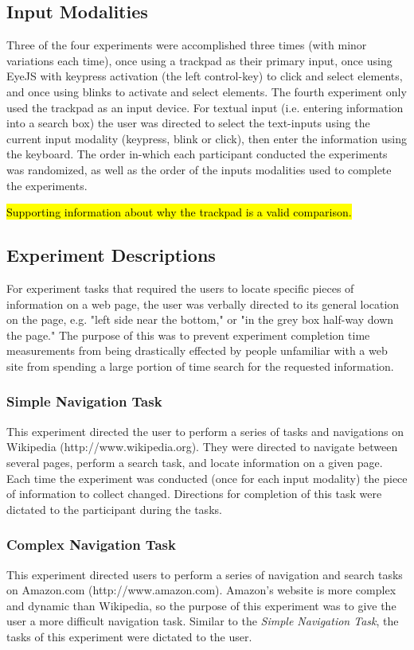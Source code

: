 \documentclass{sigchi}
\begin{document}
\subsection{Input Modalities}
Three of the four experiments were accomplished three times (with 
minor variations each time), once using a trackpad as their
primary input, once using EyeJS with keypress activation (the 
left control-key) to click and select elements, and once using 
blinks to activate and select elements. The fourth experiment 
only used the trackpad as an input device. For textual input (i.e. 
entering information into a search box) the user was directed to 
select the text-inputs using the current input modality (keypress, 
blink or click), then enter the information using the keyboard. 
The order in-which each participant conducted the experiments was 
randomized, as well as the order of the inputs modalities
used to complete the experiments. 

\hl{Supporting information about why the trackpad is a valid 
comparison.}


\subsection{Experiment Descriptions}
For experiment tasks that required the users to locate specific pieces
of information on a web page, the user was verbally directed to its
general location on the page, e.g. "left side near the bottom," or
"in the grey box half-way down the page." The purpose of this was to
prevent experiment completion time measurements from being drastically
effected by people unfamiliar with a web site from spending a large 
portion of time search for the requested information.

\subsubsection{Simple Navigation Task}
This experiment directed the user to perform a series of tasks and 
navigations on Wikipedia (http://www.wikipedia.org). They were directed
to navigate between several pages, perform a search task, and locate
information on a given page. Each time the experiment was conducted (once
for each input modality) the piece of information to collect changed.
Directions for completion of this task were dictated to the participant
during the tasks.

\subsubsection{Complex Navigation Task}
This experiment directed users to perform a series of navigation and
search tasks on Amazon.com (http://www.amazon.com). Amazon's website
is more complex and dynamic than Wikipedia, so the purpose of this 
experiment was to give the user a more difficult navigation task.
Similar to the \textit{Simple Navigation Task}, the tasks of this 
experiment were dictated to the user.
\end{document}
